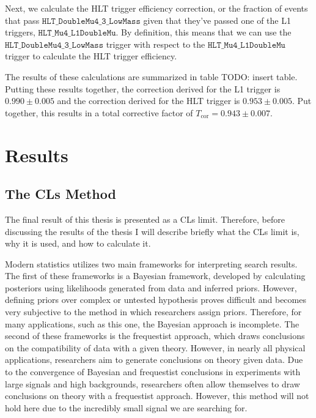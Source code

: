 Next, we calculate the HLT trigger efficiency correction, or the fraction of events that pass $\texttt{HLT\_DoubleMu4\_3\_LowMass}$ given that they've passed one of the L1 triggers, $\texttt{HLT\_Mu4\_L1DoubleMu}$. By definition, this means that we can use the $\texttt{HLT\_DoubleMu4\_3\_LowMass}$ trigger with respect to the  $\texttt{HLT\_Mu4\_L1DoubleMu}$ trigger to calculate the HLT trigger efficiency. 

The results of these calculations are summarized in table TODO: insert table. Putting these results together, the correction derived for the L1 trigger is $0.990 \pm 0.005$ and the correction derived for the HLT trigger is $0.953 \pm 0.005$. Put together, this results in a total corrective factor of $T_{\text{cor}} = 0.943 \pm 0.007$. 

\section{Results}

\subsection{The CLs Method}

The final result of this thesis is presented as a CLs limit. Therefore, before discussing the results of the thesis I will describe briefly what the CLs limit is, why it is used, and how to calculate it. 

Modern statistics utilizes two main frameworks for interpreting search results. The first of these frameworks is a Bayesian framework, developed by calculating posteriors using likelihoods generated from data and inferred priors. However, defining priors over complex or untested hypothesis proves difficult and becomes very subjective to the method in which researchers assign priors. Therefore, for many applications, such as this one, the Bayesian approach is incomplete. The second of these frameworks is the frequestist approach, which draws conclusions on the compatibility of data with a given theory. However, in nearly all physical applications, researchers aim to generate conclusions on theory given data. Due to the convergence of Bayesian and frequestist conclusions in experiments with large signals and high backgrounds, researchers often allow themselves to draw conclusions on theory with a frequestist approach. However, this method will not hold here due to the incredibly small signal we are searching for.

